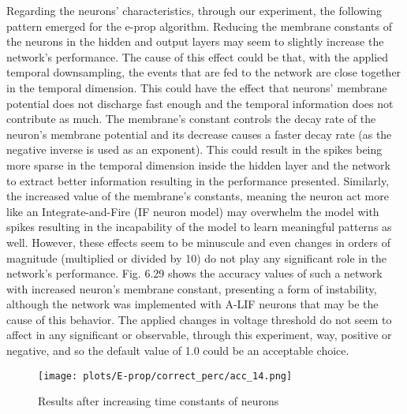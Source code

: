 \documentclass[12pt]{report}
\begin{document}
Regarding the neurons' characteristics, through our experiment, the following pattern emerged for the e-prop algorithm. Reducing the membrane constants of the neurons in the hidden and output layers may seem to slightly increase the network's performance. The cause of this effect could be that, with the applied temporal downsampling, the events that are fed to the network are close together in the temporal dimension. This could have the effect that neurons' membrane potential does not discharge fast enough and the temporal information does not contribute as much. The membrane's constant controls the decay rate of the neuron's membrane potential and its decrease causes a faster decay rate (as the negative inverse is used as an exponent). This could result in the spikes being more sparse in the temporal dimension inside the hidden layer and the network to extract better information resulting in the performance presented. Similarly, the increased value of the membrane's constants, meaning the neuron act more like an Integrate-and-Fire (IF neuron model) may overwhelm the model with spikes resulting in the incapability of the model to learn meaningful patterns as well. However, these effects seem to be minuscule and even changes in orders of magnitude (multiplied or divided by 10) do not play any significant role in the network's performance. Fig. 6.29 shows the accuracy values of such a network with increased neuron's membrane constant, presenting a form of instability, although the network was implemented with A-LIF neurons that may be the cause of this behavior. The applied changes in voltage threshold do not seem to affect in any significant or observable, through this experiment, way, positive or negative, and so the default value of 1.0 could be an acceptable choice.

\begin{figure}[htp] %
    \centering
     \texttt{[image: plots/E-prop/correct\_perc/acc\_14.png]}
    \caption{Results after increasing time constants of neurons}
    \label{fig:representation-methods}
\end{figure}
\end{document}
